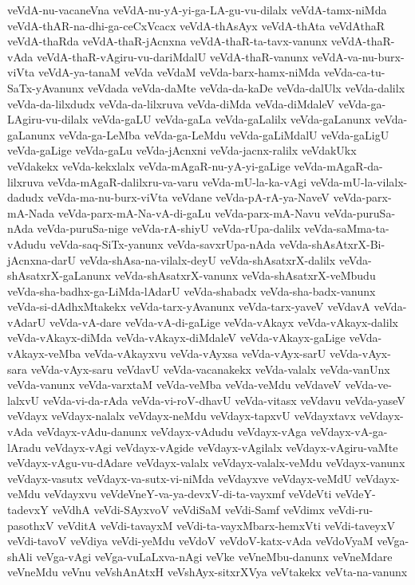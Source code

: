 {veVdA-nu-vacaneVna
veVdA-nu-yA-yi-ga-LA-gu-vu-dilalx
veVdA-tamx-niMda
veVdA-thAR-na-dhi-ga-ceCxVcacx
veVdA-thAsAyx
veVdA-thAta
veVdAthaR
veVdA-thaRda
veVdA-thaR-jAcnxna
veVdA-thaR-ta-tavx-vanunx
veVdA-thaR-vAda
veVdA-thaR-vAgiru-vu-dariMdalU
veVdA-thaR-vanunx
veVdA-va-nu-burx-viVta
veVdA-ya-tanaM
veVda
veVdaM
veVda-barx-hamx-niMda
veVda-ca-tu-SaTx-yAvanunx
veVdada
veVda-daMte
veVda-da-kaDe
veVda-dalUlx
veVda-dalilx
veVda-da-lilxdudx
veVda-da-lilxruva
veVda-diMda
veVda-diMdaleV
veVda-ga-LAgiru-vu-dilalx
veVda-gaLU
veVda-gaLa
veVda-gaLalilx
veVda-gaLanunx
veVda-gaLanunx
veVda-ga-LeMba
veVda-ga-LeMdu
veVda-gaLiMdalU
veVda-gaLigU
veVda-gaLige
veVda-gaLu
veVda-jAcnxni
veVda-jacnx-ralilx
veVdakUkx
veVdakekx
veVda-kekxlalx
veVda-mAgaR-nu-yA-yi-gaLige
veVda-mAgaR-da-lilxruva
veVda-mAgaR-dalilxru-va-varu
veVda-mU-la-ka-vAgi
veVda-mU-la-vilalx-dadudx
veVda-ma-nu-burx-viVta
veVdane
veVda-pA-rA-ya-NaveV
veVda-parx-mA-Nada
veVda-parx-mA-Na-vA-di-gaLu
veVda-parx-mA-Navu
veVda-puruSa-nAda
veVda-puruSa-nige
veVda-rA-shiyU
veVda-rUpa-dalilx
veVda-saMma-ta-vAdudu
veVda-saq-SiTx-yanunx
veVda-savxrUpa-nAda
veVda-shAsAtxrX-Bi-jAcnxna-darU
veVda-shAsa-na-vilalx-deyU
veVda-shAsatxrX-dalilx
veVda-shAsatxrX-gaLanunx
veVda-shAsatxrX-vanunx
veVda-shAsatxrX-veMbudu
veVda-sha-badhx-ga-LiMda-lAdarU
veVda-shabadx
veVda-sha-badx-vanunx
veVda-si-dAdhxMtakekx
veVda-tarx-yAvanunx
veVda-tarx-yaveV
veVdavA
veVda-vAdarU
veVda-vA-dare
veVda-vA-di-gaLige
veVda-vAkayx
veVda-vAkayx-dalilx
veVda-vAkayx-diMda
veVda-vAkayx-diMdaleV
veVda-vAkayx-gaLige
veVda-vAkayx-veMba
veVda-vAkayxvu
veVda-vAyxsa
veVda-vAyx-sarU
veVda-vAyx-sara
veVda-vAyx-saru
veVdavU
veVda-vacanakekx
veVda-valalx
veVda-vanUnx
veVda-vanunx
veVda-varxtaM
veVda-veMba
veVda-veMdu
veVdaveV
veVda-ve-lalxvU
veVda-vi-da-rAda
veVda-vi-roV-dhavU
veVda-vitasx
veVdavu
veVda-yaseV
veVdayx
veVdayx-nalalx
veVdayx-neMdu
veVdayx-tapxvU
veVdayxtavx
veVdayx-vAda
veVdayx-vAdu-danunx
veVdayx-vAdudu
veVdayx-vAga
veVdayx-vA-ga-lAradu
veVdayx-vAgi
veVdayx-vAgide
veVdayx-vAgilalx
veVdayx-vAgiru-vaMte
veVdayx-vAgu-vu-dAdare
veVdayx-valalx
veVdayx-valalx-veMdu
veVdayx-vanunx
veVdayx-vasutx
veVdayx-va-sutx-vi-niMda
veVdayxve
veVdayx-veMdU
veVdayx-veMdu
veVdayxvu
veVdeVneY-va-ya-devxV-di-ta-vayxmf
veVdeVti
veVdeY-tadevxY
veVdhA
veVdi-SAyxvoV
veVdiSaM
veVdi-Samf
veVdimx
veVdi-ru-pasothxV
veVditA
veVdi-tavayxM
veVdi-ta-vayxMbarx-hemxVti
veVdi-taveyxV
veVdi-tavoV
veVdiya
veVdi-yeMdu
veVdoV
veVdoV-katx-vAda
veVdoVyaM
veVga-shAli
veVga-vAgi
veVga-vuLaLxva-nAgi
veVke
veVneMbu-danunx
veVneMdare
veVneMdu
veVnu
veVshAnAtxH
veVshAyx-sitxrXVya
veVtakekx
veVta-na-vanunx
}

